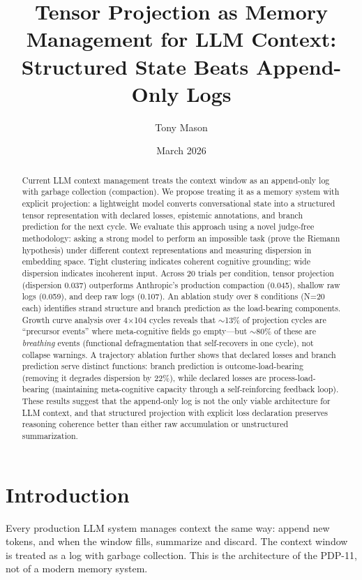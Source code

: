 \documentclass[11pt]{article}
\title{Tensor Projection as Memory Management for LLM Context:\\
Structured State Beats Append-Only Logs}
\author{Tony Mason}
\date{March 2026}
\begin{document}
\maketitle

\begin{abstract}
Current LLM context management treats the context window as an
append-only log with garbage collection (compaction). We propose
treating it as a memory system with explicit projection: a lightweight
model converts conversational state into a structured tensor
representation with declared losses, epistemic annotations, and
branch prediction for the next cycle. We evaluate this approach using
a novel judge-free methodology: asking a strong model to perform an
impossible task (prove the Riemann hypothesis) under different context
representations and measuring dispersion in embedding space. Tight
clustering indicates coherent cognitive grounding; wide dispersion
indicates incoherent input. Across 20 trials per condition, tensor
projection (dispersion 0.037) outperforms Anthropic's production
compaction (0.045), shallow raw logs (0.059), and deep raw logs
(0.107). An ablation study over 8 conditions (N=20 each) identifies
strand structure and branch prediction as the load-bearing
components. Growth curve analysis over 4$\times$104 cycles reveals that
$\sim$13\% of projection cycles are ``precursor events'' where
meta-cognitive fields go empty---but $\sim$80\% of these are
\emph{breathing} events (functional defragmentation that self-recovers
in one cycle), not collapse warnings. A trajectory ablation further
shows that declared losses and branch prediction serve distinct
functions: branch prediction is outcome-load-bearing (removing it
degrades dispersion by 22\%), while declared losses are
process-load-bearing (maintaining meta-cognitive capacity through
a self-reinforcing feedback loop). These results suggest that the
append-only log is not the only viable architecture for LLM context,
and that structured projection with explicit loss declaration
preserves reasoning coherence better than either raw accumulation or
unstructured summarization.
\end{abstract}

\section{Introduction}

Every production LLM system manages context the same way: append new
tokens, and when the window fills, summarize and discard. The context
window is treated as a log with garbage collection. This is the
architecture of the PDP-11, not of a modern memory system.
\end{document}
